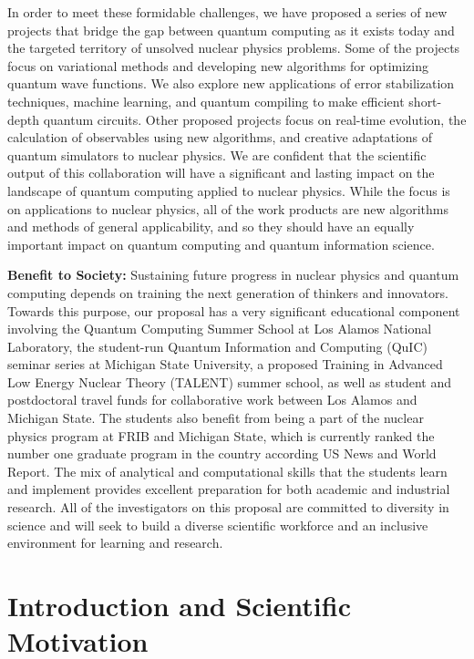 \documentclass[11pt]{article}
\begin{document}
In order to meet these formidable challenges, we have proposed a series of new projects that bridge the gap between quantum computing as it exists today and the targeted territory of unsolved nuclear physics problems.  Some of the projects focus on variational methods and developing new algorithms for optimizing quantum wave functions.  We also explore new applications of error stabilization techniques, machine learning, and quantum compiling to make efficient short-depth quantum circuits. Other proposed projects focus on real-time evolution, the calculation of observables using new algorithms, and creative adaptations of quantum simulators to nuclear physics.  We are confident that the scientific output of this collaboration will have a significant and lasting impact on the landscape of quantum computing applied to nuclear physics.  While the focus is on applications to nuclear physics, all of the work products are new algorithms and methods of general applicability, and so they should have an equally important impact on quantum computing and quantum information science.

{\bf Benefit to Society:}  Sustaining future progress in nuclear physics and quantum computing depends on training the next generation of thinkers and innovators.  Towards this purpose, our proposal has a very significant educational component involving the Quantum Computing Summer School at Los Alamos National Laboratory, the student-run Quantum Information and Computing (QuIC) seminar series at Michigan State University, a proposed Training in Advanced Low Energy Nuclear Theory (TALENT) summer school, as well as student and postdoctoral travel funds for collaborative work between Los Alamos and Michigan State.  The students also benefit from being a part of the nuclear physics program at FRIB and Michigan State, which is currently ranked the number one graduate program in the country according US News and World Report. The mix of analytical and computational skills that the students learn and implement provides excellent preparation for both academic and industrial research. All of the investigators on this proposal are committed to diversity in science and will seek to build a diverse scientific workforce and an inclusive environment for learning and research.
\clearpage

\section{Introduction and Scientific Motivation}
\pagestyle{plain}
\setcounter{page}{1}
\end{document}
